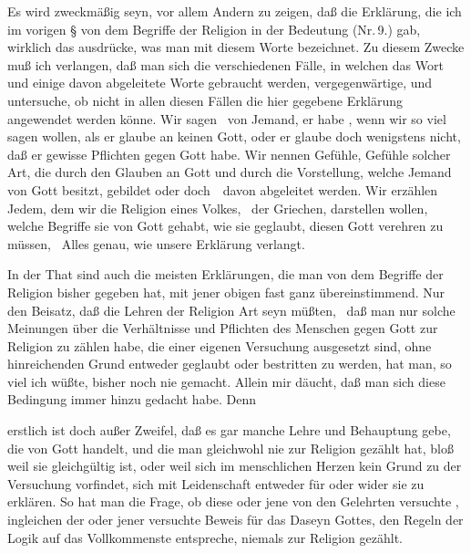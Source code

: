 \begin{aufza}
\item Es wird zweckmäßig seyn, vor allem Andern zu zeigen, daß die Erklärung, die ich im vorigen § von dem Begriffe der Religion in der  Bedeutung (Nr.\,9.) gab, wirklich das ausdrücke, was man mit diesem Worte bezeichnet. Zu diesem Zwecke muß ich verlangen, daß man sich die verschiedenen Fälle, in welchen das Wort  und einige davon abgeleitete Worte gebraucht werden, vergegenwärtige, und untersuche, ob nicht in allen diesen Fällen die hier gegebene Erklärung angewendet werden könne. Wir sagen \zB\ von Jemand, er habe , wenn wir so viel sagen wollen, als er glaube an keinen Gott, oder er glaube doch wenigstens nicht, daß er gewisse Pflichten gegen Gott habe. Wir nennen  Gefühle, Gefühle solcher Art, die durch den Glauben an Gott und durch die Vorstellung, welche Jemand von Gott besitzt, gebildet oder doch~\ davon abgeleitet werden. Wir erzählen Jedem, dem wir die Religion eines Volkes, \zB\ der Griechen, darstellen wollen, welche Begriffe sie von Gott gehabt, wie sie geglaubt, diesen Gott verehren zu müssen, \usw\ Alles genau, wie unsere Erklärung verlangt.
\item In der That sind auch die meisten Erklärungen, die man von dem Begriffe der Religion bisher gegeben hat, mit jener obigen fast ganz übereinstimmend. Nur den Beisatz, daß die Lehren der Religion  Art seyn müßten, \dh\ daß man nur solche Meinungen über die Verhältnisse und Pflichten des Menschen gegen Gott zur Religion zu zählen habe, die einer eigenen Versuchung ausgesetzt sind, ohne hinreichenden Grund entweder geglaubt oder bestritten zu werden, hat man, so viel ich wüßte, bisher noch nie gemacht. Allein mir däucht, daß man sich diese Bedingung immer  hinzu gedacht habe. Denn
\begin{aufzb}
\item erstlich ist doch außer Zweifel, daß es gar manche Lehre und Behauptung gebe, die von Gott handelt, und die man gleichwohl nie zur Religion gezählt hat, bloß weil sie gleichgültig ist, oder weil sich im menschlichen Herzen kein Grund zu der Versuchung vorfindet, sich mit Leidenschaft entweder für oder wider sie zu erklären. So hat man die Frage, ob diese oder jene von den Gelehrten versuchte , ingleichen der oder jener versuchte Beweis für das Daseyn Gottes, den Regeln der Logik auf das Vollkommenste entspreche, niemals zur Religion gezählt.

\end{aufzb}
\end{aufza}
